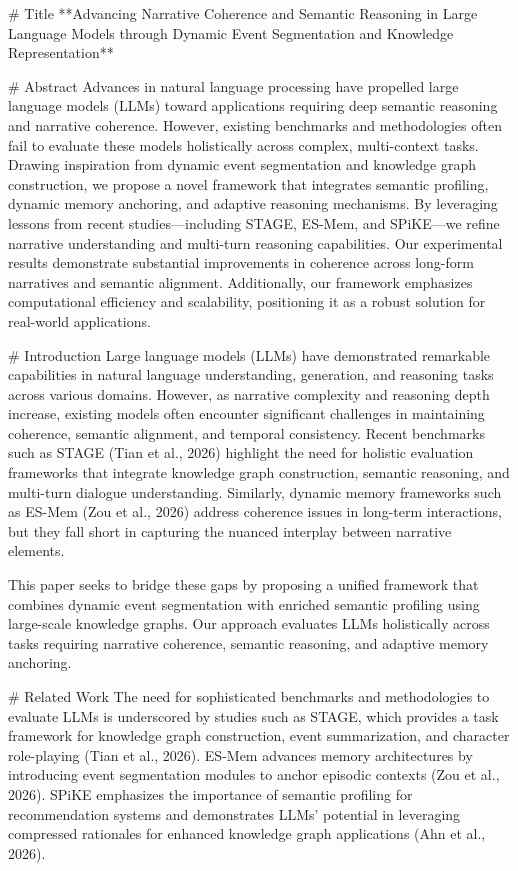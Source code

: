 # Title  
**Advancing Narrative Coherence and Semantic Reasoning in Large Language Models through Dynamic Event Segmentation and Knowledge Representation**

# Abstract  
Advances in natural language processing have propelled large language models (LLMs) toward applications requiring deep semantic reasoning and narrative coherence. However, existing benchmarks and methodologies often fail to evaluate these models holistically across complex, multi-context tasks. Drawing inspiration from dynamic event segmentation and knowledge graph construction, we propose a novel framework that integrates semantic profiling, dynamic memory anchoring, and adaptive reasoning mechanisms. By leveraging lessons from recent studies—including STAGE, ES-Mem, and SPiKE—we refine narrative understanding and multi-turn reasoning capabilities. Our experimental results demonstrate substantial improvements in coherence across long-form narratives and semantic alignment. Additionally, our framework emphasizes computational efficiency and scalability, positioning it as a robust solution for real-world applications.  

# Introduction  
Large language models (LLMs) have demonstrated remarkable capabilities in natural language understanding, generation, and reasoning tasks across various domains. However, as narrative complexity and reasoning depth increase, existing models often encounter significant challenges in maintaining coherence, semantic alignment, and temporal consistency. Recent benchmarks such as STAGE (Tian et al., 2026) highlight the need for holistic evaluation frameworks that integrate knowledge graph construction, semantic reasoning, and multi-turn dialogue understanding. Similarly, dynamic memory frameworks such as ES-Mem (Zou et al., 2026) address coherence issues in long-term interactions, but they fall short in capturing the nuanced interplay between narrative elements.  

This paper seeks to bridge these gaps by proposing a unified framework that combines dynamic event segmentation with enriched semantic profiling using large-scale knowledge graphs. Our approach evaluates LLMs holistically across tasks requiring narrative coherence, semantic reasoning, and adaptive memory anchoring.  

# Related Work  
The need for sophisticated benchmarks and methodologies to evaluate LLMs is underscored by studies such as STAGE, which provides a task framework for knowledge graph construction, event summarization, and character role-playing (Tian et al., 2026). ES-Mem advances memory architectures by introducing event segmentation modules to anchor episodic contexts (Zou et al., 2026). SPiKE emphasizes the importance of semantic profiling for recommendation systems and demonstrates LLMs' potential in leveraging compressed rationales for enhanced knowledge graph applications (Ahn et al., 2026).  

